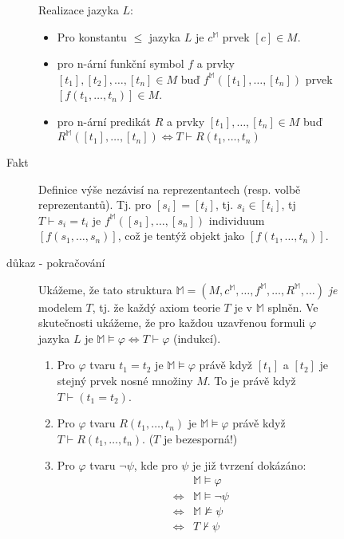 \documentclass[a4paper]{article}
\begin{document}
\begin{description}
\begin{description}
\begin{description}
							Realizace jazyka $L$:
							\begin{itemize}
								\item Pro konstantu $\le$ jazyka $L$ je $c^{\mathbb{M}}$ prvek
									$[c] \in M$.
								\item pro n-ární funkční symbol $f$ a prvky
									$[t_1], [t_2], \ldots, [t_n] \in M$ buď
									$f^{\mathbb{M}}\left( [t_1], \ldots, [t_n] \right)$
									prvek $[f(t_1, \ldots, t_n)] \in M$.
								\item pro n-ární predikát $R$ a prvky $[t_1], \ldots, [t_n] \in M$ 
									buď $R^{\mathbb{M}}([t_1], \ldots, [t_n]) \iff
									T \vdash R(t_1, \ldots, t_n)$
							\end{itemize}
						\item[Fakt] Definice výše nezávisí na reprezentantech (resp. volbě reprezentantů).
							Tj. pro $[s_i] = [t_i]$, tj. $s_i \in [t_i]$, tj $T \vdash s_i = t_i$ 
							je $f^{\mathbb{M}}([s_1], \ldots, [s_n])$ individuum $[f(s_1, \ldots, s_n)]$,
							což je tentýž objekt jako $[f(t_1, \ldots, t_n)]$.
						\item[důkaz - pokračování] Ukážeme, že tato struktura
							$\mathbb{M} =
							(M, c^{\mathbb{M}}, \ldots, f^{\mathbb{M}}, \ldots, R^{\mathbb{M}}, \ldots)$
							\textit{je} modelem $T$, tj. že každý axiom teorie $T$ je v $\mathbb{M}$ 
							splněn. Ve skutečnosti ukážeme, že pro každou uzavřenou formuli
							$\varphi$ jazyka $L$ je $\mathbb{M} \models \varphi \iff T \vdash \varphi$
							(indukcí).
							\begin{enumerate}
								\item Pro $\varphi$ tvaru $t_1 = t_2$ je $\mathbb{M} \models \varphi$
									právě když $[t_1]$ a $[t_2]$ je stejný prvek nosné
									množiny $M$. To je právě když $T \vdash (t_1 = t_2)$.
								\item Pro $\varphi$ tvaru $R(t_1, \ldots, t_n)$ je
									$\mathbb{M} \models \varphi$ právě když $T \vdash R(t_1, \ldots, t_n)$.
									($T$ je bezesporná!)
								\item Pro $\varphi$ tvaru $\neg \psi$, kde pro $\psi$ je
									již tvrzení dokázáno:
									\begin{align*}
										&\mathbb{M} \models \varphi \\
										\iff& \mathbb{M} \models \neg \psi \\
										\iff& \mathbb{M} \not \models \psi \\
										\iff& T \not \vdash \psi \\

\end{align*}
\end{enumerate}
\end{description}
\end{description}
\end{description}
\end{document}
